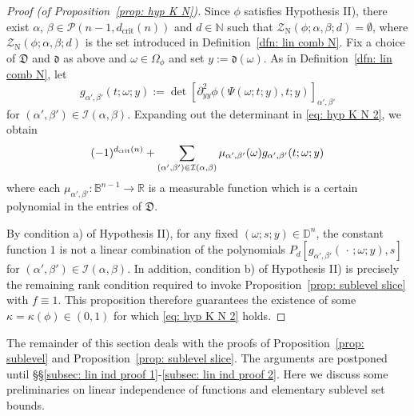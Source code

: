 \documentclass[reqno]{amsart}
\numberwithin{equation}{section}
\newcommand{\B}{\mathbb{B}}
\newcommand{\D}{\mathbb{D}}
\newcommand{\N}{\mathbb{N}}
\newcommand{\R}{\mathbb{R}}
\newcommand{\cI}{\mathcal{I}}
\newcommand{\cP}{\mathcal{P}}
\newcommand{\cZ}{\mathcal{Z}}
\newcommand{\fd}{\mathfrak{d}}
\newcommand{\fD}{\mathfrak{D}}
\theoremstyle{plain}
\theoremstyle{definition}
\newcommand{\tN}{\mathrm{N}}
\newcommand{\crit}{\mathrm{crit}}
\begin{document}
\begin{proof}[Proof (of Proposition~\ref{prop: hyp K N})]
Since $\phi$ satisfies Hypothesis II), there exist $\alpha$, $\beta \in \cP(n-1, d_{\crit}(n))$ and $d \in \N$ such that $\cZ_{\tN}(\phi; \alpha, \beta; d) = \emptyset$, where $\cZ_{\tN}(\phi; \alpha, \beta; d)$ is the set introduced in Definition~\ref{dfn: lin comb N}. Fix a choice of $\fD$ and $\fd$ as above and $\omega \in \Omega_{\phi}$ and set $y := \fd(\omega)$. As in Definition~\ref{dfn: lin comb N}, let
\begin{equation*}
  g_{\alpha',\beta'}(t;\omega;y) :=  \det[\partial_{yy}^2 \phi(\Psi(\omega;t;y),t;y)]_{\alpha', \beta'}
\end{equation*}
for $(\alpha',\beta') \in \cI(\alpha,\beta)$. Expanding out the determinant in \eqref{eq: hyp K N 2}, we obtain
\begin{equation*}
   (-1)^{d_{\rm crit}(n)} +  \sum_{(\alpha',\beta') \in \cI(\alpha,\beta)} \mu_{\alpha', \beta'}(\omega) g_{\alpha', \beta'}(t;\omega;y)
\end{equation*}
where each $\mu_{\alpha', \beta'} \colon \B^{n-1} \to \R$ is a measurable function which is a certain polynomial in the entries of $\fD$.


By condition a) of Hypothesis II), for any fixed $(\omega; s; y) \in \D^n$, the constant function $1$ is not a linear combination of the polynomials $P_d[g_{\alpha',\beta'}(\,\cdot\,;\omega;y), s]$ for $(\alpha',\beta') \in \cI(\alpha,\beta)$. In addition, condition b) of Hypothesis II) is precisely the remaining rank condition required to invoke Proposition~\ref{prop: sublevel slice} with $f \equiv 1$. This proposition therefore guarantees the existence of some $\kappa = \kappa(\phi) \in (0,1)$ for which \eqref{eq: hyp K N 2} holds. 
\end{proof}



The remainder of this section deals with the proofs of Proposition~\ref{prop: sublevel} and Proposition~\ref{prop: sublevel slice}. The arguments are postponed until \S\S\ref{subsec: lin ind proof 1}-\ref{subsec: lin ind proof 2}. Here we discuss some preliminaries on linear independence of functions and elementary sublevel set bounds.



\end{document}
